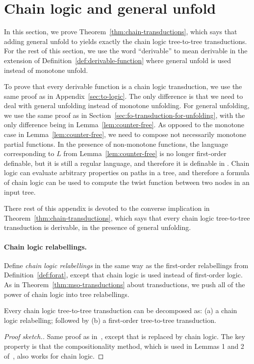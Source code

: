\section{Chain logic and general unfold}
\label{sec:appendix-chain}
In this section, we prove Theorem~\ref{thm:chain-transductions}, which says that adding general unfold to \mso yields exactly the chain logic tree-to-tree transductions. For the rest of this section, we use the word ``derivable'' to mean derivable in the extension of Definition~\ref{def:derivable-function} where general unfold is used instead of monotone unfold. 

To prove that every derivable function is a chain logic transduction, we use the same proof as in Appendix~\ref{sec:to-logic}. The only difference is that we need to deal with  general unfolding instead of monotone unfolding. For general unfolding, we use the same proof as in Section~\ref{sec:fo-transduction-for-unfolding}, with the only difference being in Lemma~\ref{lem:counter-free}. As opposed to the monotone case in Lemma~\ref{lem:counter-free}, we need to compose  not necessarily monotone partial functions. In the presence of non-monotone functions, the language corresponding to $L$ from Lemma~\ref{lem:counter-free} is no longer first-order definable, but it is still a regular language, and therefore it is definable in \mso. Chain logic can evaluate arbitrary \mso properties on paths in a tree, and therefore a formula of chain logic can be used to compute the twist function between two nodes in an input tree.

There rest of this appendix is devoted to the converse implication in Theorem~\ref{thm:chain-transductions}, which says that every chain logic tree-to-tree transduction is derivable, in the presence of general unfolding.



\paragraph*{Chain logic relabellings.}
Define  \emph{chain logic relabellings} in the same way as the first-order relabellings from Definition~\ref{def:forat}, except that chain logic is used instead of first-order logic.   As in Theorem~\ref{thm:mso-transductions} about \mso transductions, we push all of the power of chain logic into  tree relabellings.

\begin{lemma}\label{lem:chain-colcombet}
    Every   chain logic tree-to-tree transduction can be decomposed as: (a) a chain logic relabelling; followed by (b) a first-order tree-to-tree transduction. 
\end{lemma}
\begin{proof}[Proof sketch.]
    Same proof as in~\cite[Corollary 1]{colcombetCombinatorialTheoremTrees2007}, except that \mso is replaced  by chain logic. The key property is that the compositionality method, which is used in Lemmas 1 and 2 of~\cite{colcombetCombinatorialTheoremTrees2007},  also works for chain logic. 
\end{proof}

